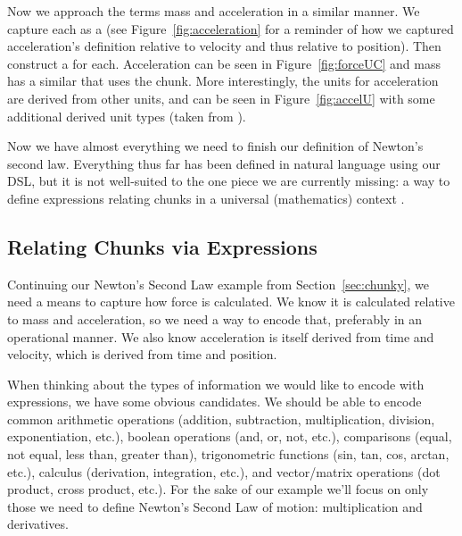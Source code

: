 
Now we approach the terms mass and acceleration in a similar manner. We capture 
each as a  (see Figure~\ref{fig:acceleration} for a 
reminder of how we captured acceleration's definition relative to velocity and 
thus relative to position). Then construct a  for each. 
Acceleration can be seen in Figure~\ref{fig:forceUC} and mass has a similar 
 that uses the  chunk. More 
interestingly, the units for acceleration are derived from other units, and can 
be seen in Figure~\ref{fig:accelU} with some additional derived unit types 
(taken from ).

Now we have almost everything we need to finish our definition of Newton's 
second law. Everything thus far has been defined in natural language using our 
 DSL, but it is not well-suited to the one piece we are 
currently missing: a way to define expressions relating chunks in a universal 
 (mathematics) context .

\subsection{Relating Chunks via Expressions}
\label{sec:expr}

Continuing our Newton's Second Law example from Section~\ref{sec:chunky}, we 
need a means to capture how force is calculated. We know it is calculated 
relative to mass and acceleration, so we need a way to encode that, preferably 
in an operational manner. We also know acceleration is itself derived from 
time and velocity, which is derived from time and position.

When thinking about the types of information we would like to encode with 
expressions, we have some obvious candidates. We should be able to encode 
common arithmetic operations (addition, subtraction, multiplication, division, 
exponentiation, etc.), boolean operations (and, or, not, etc.), comparisons 
(equal, not equal, less than, greater than), trigonometric functions (sin, tan, 
cos, arctan, etc.), calculus (derivation, integration, etc.), and vector/matrix 
operations (dot product, cross product, etc.). For the sake of our example 
we'll focus on only those we need to define Newton's Second Law of motion: 
multiplication and derivatives.


